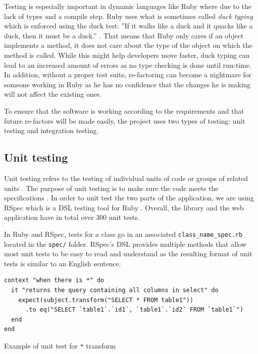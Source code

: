 Testing is especially important in dynamic languages like Ruby where due to the lack of types and a compile step. Ruby uses what is sometimes called \textit{duck typing} which is enforced using the duck test: ''If it walks like a duck and it quacks like a duck, then it must be a duck.'' \citep{wiki:duck_typing}. That means that Ruby only cares if an object implements a method, it does not care about the type of the object on which the method is called. While this might help developers move faster, duck typing can lead to an increased amount of errors as no type checking is done until run-time. In addition, without a proper test suite, re-factoring can become a nightmare for someone working in Ruby as he has no confidence that the changes he is making will not affect the existing ones.

To ensure that the software is working according to the requirements and that future re-factors will be made easily, the project uses two types of testing: unit testing and integration testing.

\subsection{Unit testing}

Unit testing refers to the testing of individual units of code or groups of related units \citep{unit_testing}. The purpose of unit testing is to make sure the code meets the specifications \citep{Olan2003}. In order to unit test the two parts of the application, we are using RSpec which is a DSL testing tool for Ruby \citep{wiki:rspec}. Overall, the library and the web application have in total over 300 unit tests.

In Ruby and RSpec, tests for a class go in an associated \texttt{class\_name\_spec.rb} located in the \texttt{spec/} folder. RSpec's DSL provides multiple methods that allow most unit tests to be easy to read and understand as the resulting format of unit tests is similar to an English sentence.

\begin{code}
\begin{verbatim}
context "when there is *" do
  it "returns the query containing all columns in select" do
    expect(subject.transform("SELECT * FROM table1"))
      .to eq("SELECT `table1`.`id1`, `table1`.`id2` FROM `table1`")
  end
end
\end{verbatim}
\caption{Example of unit test for \texttt{*} transform}
\label{fig:example_unit_test}
\end{code}

